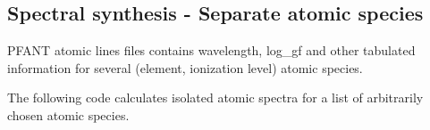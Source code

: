 \documentclass[letterpaper,10pt,english]{sphinxmanual}
\begin{document}
\begin{sphinxVerbatim}[commandchars=\\\{\}]
      
    \PYG{p}{[}\PYG{p}{[}\PYG{p}{]}\PYG{p}{]} 
      
      
\end{sphinxVerbatim}

\begin{figure}[htbp]
\centering

\noindent{}
\end{figure}


\subsection{Spectral synthesis - Separate atomic species}
\label{\detokenize{pyfant:spectral-synthesis-separate-atomic-species}}
PFANT atomic lines files contains wavelength, log\_gf and other tabulated information for several
(element, ionization level) atomic species.

The following code calculates isolated atomic spectra for a list of arbitrarily chosen atomic species.
\end{document}
